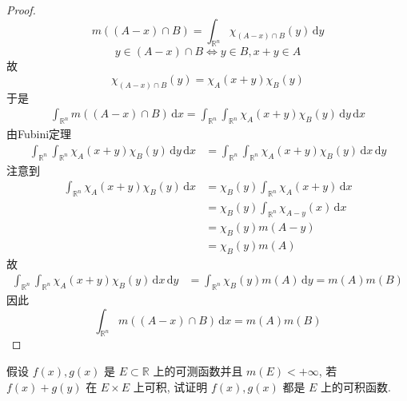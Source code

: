 \documentclass[../main.tex]{subfiles}
\begin{document}
\begin{proof}
   \[
   m\left( \left( A-x \right)\cap B  \right)= \int_{\mathbb{R} ^{n}}\chi _{\left( A-x \right)\cap B }\left( y \right)\,\mathrm{d} y  
   \] \[
   y\in \left( A-x \right)\cap B\iff y\in B, x+ y\in A 
   \]故 \[
   \chi _{\left( A-x \right)\cap B }\left( y \right)= \chi _{A}\left( x+ y \right)\chi _{B}\left( y \right)  
   \]于是  \[
   \begin{aligned}
   \int_{\mathbb{R} ^{n}}m\left( \left( A-x \right)\cap B  \right)\,\mathrm{d} x= \int_{\mathbb{R} ^{n}}\int_{\mathbb{R} ^{n}}\chi _{A}\left( x+ y \right)\chi _{B}\left( y \right)  \,\mathrm{d} y\,\mathrm{d} x 
   \end{aligned}  
   \]由Fubini定理 \[
  \begin{aligned}
   \int_{\mathbb{R} ^{n}}\int_{\mathbb{R} ^{n}}\chi _{A}\left( x+ y \right)\chi _{B}\left( y \right)  \,\mathrm{d} y\,\mathrm{d} x&= \int_{\mathbb{R} ^{n}}\int_{\mathbb{R} ^{n}}\chi _{A}\left( x+ y \right)\chi _{B}\left( y \right)  \,\mathrm{d} x\,\mathrm{d} y  
  \end{aligned}  
   \]注意到\[
   \begin{aligned}
   \int_{\mathbb{R} ^{n}}\chi _{A}\left( x+ y \right)\chi _{B}\left( y \right)  \,\mathrm{d} x&=  \chi _{B}\left( y \right)\int_{\mathbb{R} ^{n}}\chi _{A}\left( x+ y \right)\,\mathrm{d} x  \\ 
    &= \chi _{B}\left( y \right)\int_{\mathbb{R} ^{n}}\chi _{A-y}\left( x \right)\,\mathrm{d} x\\ 
     &= \chi _{B}\left( y \right)m\left( A-y \right)\\ 
      &= \chi _{B}\left( y \right)m\left( A \right)          
   \end{aligned}
   \]故 \[
  \begin{aligned}
   \int_{\mathbb{R} ^{n}}\int_{\mathbb{R} ^{n}}\chi _{A}\left( x+ y \right)\chi _{B}\left( y \right)\,\mathrm{d} x\,\mathrm{d} y &= \int_{\mathbb{R} ^{n}}\chi _{B}\left( y \right)m\left( A \right)\,\mathrm{d} y= m\left( A \right)m\left( B \right)    
  \end{aligned}
   \] 因此 \[
   \int_{\mathbb{R} ^{n}}m\left( \left( A-x \right)\cap B  \right)\,\mathrm{d} x= m\left( A \right)m\left( B \right)   
   \]
\end{proof}
\begin{exercise}{}{}
 假设 \(f(x),g(x)\) 是 \(E\subset \mathbb{R}\) 上的可测函数并且 \(m(E)<+\infty\), 若 \(f(x)+g(y)\) 在 \(E\times E\) 上可积, 试证明 \(f(x),g(x)\) 都是 \(E\) 上的可积函数.
\end{exercise}
\end{document}
